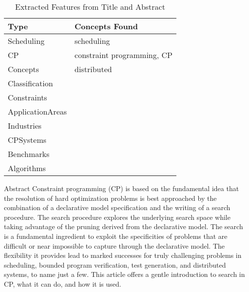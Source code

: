 {\scriptsize
\begin{longtable}{p{2cm}p{20cm}}
\caption{Extracted Features from Title and Abstract}\\ \toprule
Type & Concepts Found\\ \midrule
\endhead
\bottomrule
\endfoot
Scheduling & scheduling\\ 
CP & constraint programming, CP\\ 
Concepts & distributed\\ 
Classification & \\ 
Constraints & \\ 
ApplicationAreas & \\ 
Industries & \\ 
CPSystems & \\ 
Benchmarks & \\ 
Algorithms & \\ 
\end{longtable}
}

 Abstract  Constraint programming (CP) is based on the fundamental idea that the resolution of hard optimization problems is best approached by the combination of a declarative model specification and the writing of a search procedure. The search procedure explores the underlying search space while taking advantage of the pruning derived from the declarative model. The search is a fundamental ingredient to exploit the specificities of problems that are difficult or near impossible to capture through the declarative model. The flexibility it provides lead to marked successes for truly challenging problems in scheduling, bounded program verification, test generation, and distributed systems, to name just a few. This article offers a gentle introduction to search in CP, what it can do, and how it is used. 

